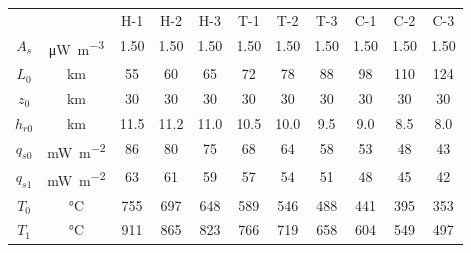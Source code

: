 \begin{tabular}{ccccccccccc}
\toprule
& & H-1 & H-2 & H-3 & T-1 & T-2 & T-3 & C-1 & C-2 & C-3 \\
$A_{s}$ & \si{\uW\per\m\cubed} & 1.50 & 1.50 & 1.50 & 1.50 & 1.50 & 1.50 & 1.50 & 1.50 & 1.50 \\
$L_{0}$ & \si{\km} & 55 & 60 & 65 & 72 & 78 & 88 & 98 & 110 & 124 \\
$z_{0}$ & \si{\km} & 30 & 30 & 30 & 30 & 30 & 30 & 30 & 30 & 30 \\
$h_{r0}$ & \si{\km} & 11.5 & 11.2 & 11.0 & 10.5 & 10.0 & 9.5 & 9.0 & 8.5 & 8.0 \\
\midrule
$q_{s0}$ & \si{\mW\per\m\squared} & 86 & 80 & 75 & 68 & 64 & 58 & 53 & 48 & 43 \\
$q_{s1}$ & \si{\mW\per\m\squared} & 63 & 61 & 59 & 57 & 54 & 51 & 48 & 45 & 42 \\
$T_{0}$ & \si{\degreeCelsius} & 755 & 697 & 648 & 589 & 546 & 488 & 441 & 395 & 353 \\
$T_{1}$ & \si{\degreeCelsius} & 911 & 865 & 823 & 766 & 719 & 658 & 604 & 549 & 497 \\
\bottomrule
\end{tabular}
